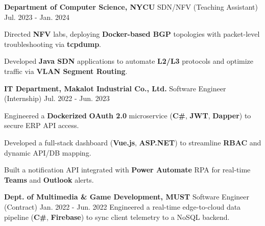 \vspace{-0.25cm}

\begin{cventries}

  \cventry
    {} %
    {\textbf{Department of Computer Science, NYCU} \textbar{} \textmd{SDN/NFV (Teaching Assistant)}} 
    {Jul. 2023 - Jan. 2024} 
    {} 
    {
\begin{cvitems}
       \item {Directed \textbf{NFV} labs, deploying \textbf{Docker-based BGP} topologies with packet-level troubleshooting via \textbf{tcpdump}.}
       \item {Developed \textbf{Java SDN} applications to automate \textbf{L2/L3} protocols and optimize traffic via \textbf{VLAN Segment Routing}.}
      \end{cvitems}
    }

\vspace{0.4cm} 

  \cventry
    {} 
    {\textbf{IT Department, Makalot Industrial Co., Ltd.} \textbar{} \textmd{Software Engineer (Internship)}} 
    {Jul. 2022 - Jun. 2023} 
    {} 
    {
\begin{cvitems}
        \item {Engineered a \textbf{Dockerized} \textbf{OAuth 2.0} microservice (\textbf{C\#}, \textbf{JWT}, \textbf{Dapper}) to secure ERP API access.}
        \item {Developed a full-stack dashboard (\textbf{Vue.js}, \textbf{ASP.NET}) to streamline \textbf{RBAC} and dynamic API/DB mapping.}
        \item {Built a notification API integrated with \textbf{Power Automate} RPA for real-time \textbf{Teams} and \textbf{Outlook} alerts.}
      \end{cvitems}
    }

\vspace{0.4cm} 

  \cventry
    {} 
    {\textbf{Dept. of Multimedia \& Game Development, MUST} \textbar{} \textmd{Software Engineer (Contract)}} 
    {Jan. 2022 - Jun. 2022} 
    {} 
    {
      \vspace{-1mm} 
      \hspace*{1mm} \textbullet \hspace*{1.2mm} {Engineered a real-time edge-to-cloud data pipeline (\textbf{C\#}, \textbf{Firebase}) to sync client telemetry to a NoSQL backend.}
      }


\end{cventries}
